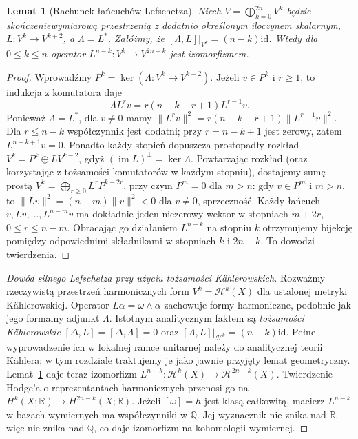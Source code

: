 \documentclass[11pt,a4paper,oneside]{report}
\newcommand{\R}{\mathbb{R}}
\newcommand{\Q}{\mathbb{Q}}
\newcommand{\id}{\mathrm{id}}
\theoremstyle{plain}
\newtheorem{lemat}[twierdzenie]{Lemat}
\theoremstyle{definition}
\theoremstyle{remark}
\begin{document}
\begin{lemat}[Rachunek łańcuchów Lefschetza]
\label{lem:xvii-sl2}
Niech $V=\bigoplus_{k=0}^{2n}V^k$ będzie skończeniewymiarową
przestrzenią z dodatnio określonym iloczynem skalarnym,
$L:V^k\to V^{k+2}$, a $\Lambda=L^*$.
Załóżmy, że $[\Lambda,L]|_{V^k}=(n-k)\id$.
Wtedy dla $0\le k\le n$ operator
$L^{n-k}:V^k\to V^{2n-k}$ jest izomorfizmem.
\end{lemat}
\begin{proof}
Wprowadźmy $P^k=\ker(\Lambda:V^k\to V^{k-2})$.
Jeżeli $v\in P^k$ i $r\ge1$, to indukcja z komutatora daje
\[
\Lambda L^rv=r(n-k-r+1)L^{r-1}v.
\]
Ponieważ $\Lambda=L^*$, dla $v\ne0$ mamy
$\|L^rv\|^2=r(n-k-r+1)\|L^{r-1}v\|^2$.
Dla $r\le n-k$ współczynnik jest dodatni; przy
$r=n-k+1$ jest zerowy, zatem $L^{n-k+1}v=0$.
Ponadto każdy stopień dopuszcza prostopadły rozkład
$V^k=P^k\oplus LV^{k-2}$, gdyż $(\operatorname{im}L)^\perp=\ker\Lambda$.
Powtarzając rozkład (oraz korzystając z tożsamości komutatorów
w każdym stopniu), dostajemy sumę prostą
$V^k=\bigoplus_{r\ge0}L^rP^{k-2r}$, przy czym
$P^m=0$ dla $m>n$: gdy $v\in P^m$ i $m>n$, to
$\|Lv\|^2=(n-m)\|v\|^2<0$ dla $v\ne0$, sprzeczność.
Każdy łańcuch $v,Lv,\ldots,L^{n-m}v$ ma dokładnie
jeden niezerowy wektor w stopniach $m+2r$,
$0\le r\le n-m$. Obracając go działaniem $L^{n-k}$
na stopniu $k$ otrzymujemy bijekcję pomiędzy
odpowiednimi składnikami w stopniach $k$ i $2n-k$.
To dowodzi twierdzenia.
\end{proof}
\begin{proof}[Dowód silnego Lefschetza przy użyciu tożsamości Kählerowskich]
Rozważmy rzeczywistą przestrzeń harmonicznych form
$V^k=\mathcal H^k(X)$ dla ustalonej metryki Kählerowskiej.
Operator $L\alpha=\omega\wedge\alpha$ zachowuje formy
harmoniczne, podobnie jak jego formalny adjunkt $\Lambda$.
Istotnym analitycznym faktem są \emph{tożsamości Kählerowskie}
$[\Delta,L]=[\Delta,\Lambda]=0$ oraz
$[\Lambda,L]|_{\mathcal H^k}=(n-k)\id$.
Pełne wyprowadzenie ich w lokalnej ramce unitarnej należy do
analitycznej teorii Kählera; w tym rozdziale traktujemy je jako
jawnie przyjęty lemat geometryczny.
Lemat~\ref{lem:xvii-sl2} daje teraz izomorfizm
$L^{n-k}:\mathcal H^k(X)\to\mathcal H^{2n-k}(X)$.
Twierdzenie Hodge'a o reprezentantach harmonicznych
przenosi go na $H^k(X;\R)\to H^{2n-k}(X;\R)$.
Jeżeli $[\omega]=h$ jest klasą całkowitą,
macierz $L^{n-k}$ w bazach wymiernych ma współczynniki
w $\Q$. Jej wyznacznik nie znika nad $\R$, więc nie znika
nad $\Q$, co daje izomorfizm na kohomologii wymiernej.
\end{proof}
\end{document}
